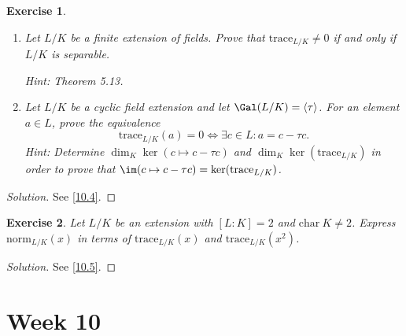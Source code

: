 \documentclass[a4paper,10pt,reqno]{amsart}
\newtheorem{ex}{Exercise}[section]
\newenvironment{sol}
  {\renewcommand\qedsymbol{$\blacksquare$}\begin{proof}[Solution]}
  {\end{proof}}
\begin{document}
\begin{ex}
\label{9.4}~

    \begin{enumerate}[label=(\roman*)]
        \item Let $L/K$ be a finite extension of fields. Prove that $\mathrm{trace}_{L/K} \neq 0$ if and only if $L/K$ is separable.

    \noindent \textit{Hint:} Theorem 5.13.
        \item Let $L/K$ be a cyclic field extension and let $\Gal(L/K) = \left\langle \tau \right\rangle$. For an element $a \in L$, prove the equivalence
        \[
        \mathrm{trace}_{L/K}(a)=0 \Leftrightarrow \exists c \in L: a = c - \tau c.
        \]
        \noindent \textit{Hint:} Determine $\dim_K \ker (c \mapsto c- \tau c)$ and $\dim_K \ker (\mathrm{trace}_{L/K})$ in order to prove that $\im(c \mapsto c - \tau c) = \ker (\mathrm{trace}_{L/K})$.
    \end{enumerate}
\end{ex}
\begin{sol}
    See \cref{10.4}.
\end{sol}


\begin{ex}
\label{9.5}
    Let $L/K$ be an extension with $[L:K] = 2$ and $\mathrm{char}\ K \neq 2$. Express $\mathrm{norm}_{L/K}(x)$ in terms of $\mathrm{trace}_{L/K}(x)$ and $\mathrm{trace}_{L/K}(x^2)$.
\end{ex}
\begin{sol}
    See \cref{10.5}.
\end{sol}

\newpage

\section{Week 10}
\end{document}
